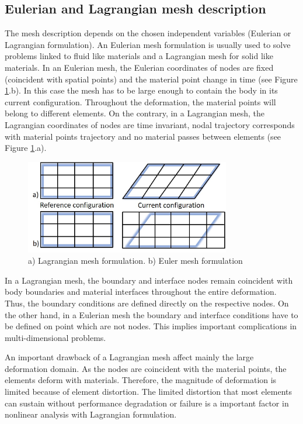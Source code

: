 \subsection{Eulerian and Lagrangian mesh description}

The mesh description depends on the chosen independent variables (Eulerian or Lagrangian formulation). An Eulerian mesh formulation is usually used to solve problems linked to fluid like materials and a Lagrangian mesh for solid like materials. In an Eulerian mesh, the Eulerian coordinates of nodes are fixed (coincident with spatial points) and the material point change in time (see Figure \ref{lagrangian_mesh}.b). In this case the mesh has to be large enough to contain the body in its current configuration. Throughout the deformation, the material points will belong to different elements. On the contrary, in a Lagrangian mesh, the Lagrangian coordinates of nodes are time invariant, nodal trajectory corresponds with material points trajectory and no material passes between elements (see Figure \ref{lagrangian_mesh}.a). 

\begin{figure}[!h]
\centering
\includegraphics[width=0.8\textwidth,keepaspectratio]{figures/lagrangian_mesh.jpg} 
\caption{a) Lagrangian mesh formulation. b) Euler mesh formulation}
\label{lagrangian_mesh}
\end{figure}
 

In a Lagrangian mesh, the boundary and interface nodes remain coincident with body boundaries and material interfaces throughout the entire deformation. Thus, the boundary conditions are defined directly on the respective nodes. On the other hand, in a Eulerian mesh the boundary and interface conditions have to be defined on point which are not nodes. This implies important complications in multi-dimensional problems.  

An important drawback of a Lagrangian mesh affect mainly the large deformation domain. As the nodes are coincident with the material points, the elements deform with materials. Therefore, the magnitude of deformation is limited because of element distortion. The limited distortion that most elements can sustain without performance degradation or failure is a important factor in nonlinear analysis with Lagrangian formulation. 
 

